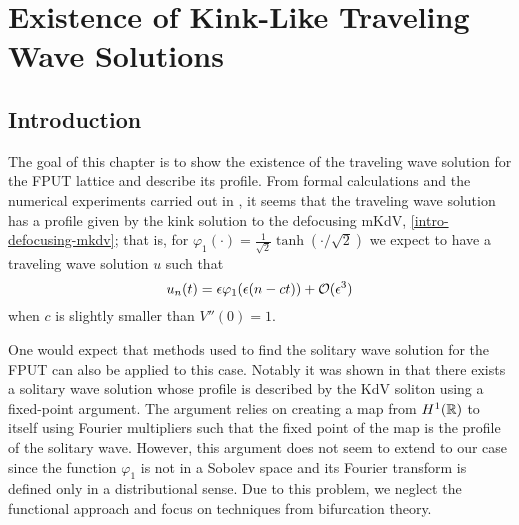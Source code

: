 \chapter{Existence of Kink-Like Traveling Wave Solutions}
\label{chp:existence}
\pagestyle{myheadings}

\section{Introduction}

The goal of this chapter is to show the existence of the traveling wave solution for the FPUT lattice and describe its profile. From formal calculations and the numerical experiments carried out in \cite{pace2019beta}, it seems that the traveling wave solution has a profile given by the kink solution to the defocusing mKdV, \cref{intro-defocusing-mkdv}; that is, for \(\varphi_1(\cdot) = \frac 1 {\sqrt 2} \tanh(\cdot/\sqrt 2)\) we expect to have a traveling wave solution \(u\) such that 
\begin{equation}\label{formal-approximation}
	u_n(t) = \epsilon \varphi_1(\epsilon(n - ct)) +\mathcal{O}(\epsilon^3)
\end{equation}
when \(c\) is slightly smaller than \(V''(0) = 1\).

One would expect that methods used to find the solitary wave solution for the FPUT can also be applied to this case. Notably it was shown in \cite{friesecke1999solitary} that there exists a solitary wave solution whose profile is described by the KdV soliton using a fixed-point argument. The argument relies on creating a map from \(H^1(\mathbb{R})\) to itself using Fourier multipliers such that the fixed point of the map is the profile of the solitary wave. However, this argument does not seem to extend to our case since the function \(\varphi_1\) is not in a Sobolev space and its Fourier transform is defined only in a distributional sense. Due to this problem, we neglect the functional approach and focus on techniques from bifurcation theory. 

